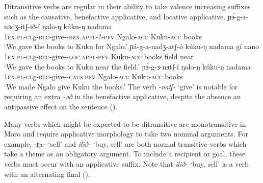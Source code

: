 Ditransitive verbs are regular in their ability to take valence increasing suffixes such as the causative, benefactive applicative, and locative applicative. 
\ea 
\ea \gll ɲɜ́-g-ɜ-nɜdʒ-itʃ-ið-í ŋalo-ŋ kúku-ŋ nadama\\ %
 		\textsc{1ex.pl-cl}g-\textsc{rtc-}give-\textsc{-ben.appl-?-pfv} Ngalo-\textsc{acc}  Kuku-\textsc{acc} books\\
	\glt ‘We gave the books to Kuku for Ngalo.’\label{ex:ch12:giveben}
\ex \gll ɲá-g-a-nadʒ-atʃ-ó kúku-ŋ nadama gí nano\\
 		\textsc{1ex.pl-cl}g-\textsc{rtc-}give-\textsc{-loc.appl-pfv} Kuku-\textsc{acc} books field near\\
	\glt ‘We gave the books to Kuku near the field.’\label{ex:ch12:giveloc}
\ex \gll ɲɜ́-g-ɜ-nɜtʃ-í ŋalo-ŋ kúku-ŋ nadama\\ 
 		\textsc{1ex.pl-cl}g-\textsc{rtc-}give-\textsc{-caus.pfv} Ngalo-\textsc{acc}  Kuku-\textsc{acc} books\\
	\glt ‘We made Ngalo give Kuku the books.’ \label{ex:ch12:givecaus}
\z 
\z 
The verb \textit{-natʃ-} `give' is notable for requiring an extra \textit{-əð} in the benefactive applicative, despite the absence an antipassive effect on the sentence (). %

Many verbs which might be expected to be ditransitive are monotransitive in Moro and require applicative morphology to take two nominal arguments. For example, \textit{-t̪w-} `sell' and \textit{ilið-} `buy, sell' are both normal transitive verbs which take a theme as an obligatory argument. To include a recipient or goal, these verbs must occur with an applicative suffix. Note that \textit{ilið-} `buy, sell' is a verb with an alternating final ().


